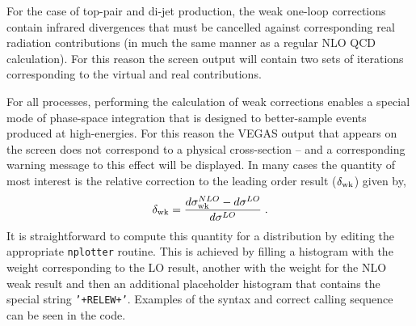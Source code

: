 \documentclass{article}
\begin{document}
For the case of top-pair and di-jet production, the weak one-loop corrections contain
infrared divergences that must be cancelled against corresponding real radiation
contributions (in much the same manner as a regular NLO QCD calculation).  For this
reason the screen output will contain two sets of iterations corresponding to the
virtual and real contributions.

For all processes, performing the calculation of weak
corrections enables a special mode of phase-space integration that is designed to
better-sample events produced at high-energies.  For this reason the VEGAS output that
appears on the screen does not correspond to a physical cross-section -- and a corresponding
warning message to this effect will be displayed.  In many cases the quantity of most interest
is the relative correction to the leading order result ($\delta_{\rm wk}$) given by,
\begin{equation}
\delta_{\rm wk} = \frac{d\sigma_{\rm wk}^{NLO} - d\sigma^{LO}}{d\sigma^{LO}} \;.
\end{equation}
It is straightforward to compute this quantity for a distribution by editing the appropriate
{\tt nplotter} routine.  This is achieved by filling a histogram with the weight corresponding
to the LO result, another with the weight for the NLO weak result and then an additional placeholder
histogram that contains the special string {\tt '+RELEW+'}.  Examples of the syntax and correct calling
sequence can be seen in the code.
\end{document}
